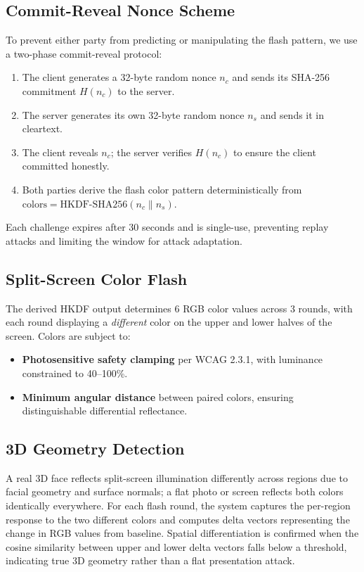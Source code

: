 \documentclass[conference]{IEEEtran}
\begin{document}
\subsection{Commit-Reveal Nonce Scheme}

To prevent either party from predicting or manipulating the flash pattern, we use a two-phase commit-reveal protocol:

\begin{enumerate}
\item The client generates a 32-byte random nonce $n_c$ and sends its SHA-256 commitment $H(n_c)$ to the server.
\item The server generates its own 32-byte random nonce $n_s$ and sends it in cleartext.
\item The client reveals $n_c$; the server verifies $H(n_c)$ to ensure the client committed honestly.
\item Both parties derive the flash color pattern deterministically from $\text{colors} = \text{HKDF-SHA256}(n_c \| n_s)$.
\end{enumerate}

Each challenge expires after 30 seconds and is single-use, preventing replay attacks and limiting the window for attack adaptation.

\subsection{Split-Screen Color Flash}

The derived HKDF output determines 6 RGB color values across 3 rounds, with each round displaying a \emph{different} color on the upper and lower halves of the screen. Colors are subject to:

\begin{itemize}
\item \textbf{Photosensitive safety clamping} per WCAG 2.3.1, with luminance constrained to 40--100\%.
\item \textbf{Minimum angular distance} between paired colors, ensuring distinguishable differential reflectance.
\end{itemize}

\subsection{3D Geometry Detection}

A real 3D face reflects split-screen illumination differently across regions due to facial geometry and surface normals; a flat photo or screen reflects both colors identically everywhere. For each flash round, the system captures the per-region response to the two different colors and computes delta vectors representing the change in RGB values from baseline. Spatial differentiation is confirmed when the cosine similarity between upper and lower delta vectors falls below a threshold, indicating true 3D geometry rather than a flat presentation attack.
\end{document}
